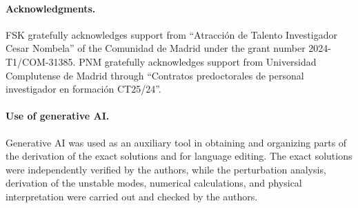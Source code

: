 \documentclass[aps,prl,reprint,superscriptaddress,nofootinbib,floatfix]{revtex4-2}
\begin{document}
\paragraph{Acknowledgments.}
FSK gratefully acknowledges support from ``Atracci\'on de Talento Investigador Cesar Nombela'' of the Comunidad de Madrid under the grant number 2024-T1/COM-31385.
PNM gratefully acknowledges support from Universidad Complutense de Madrid through ``Contratos predoctorales de personal investigador en formación CT25/24''.


\paragraph{Use of generative AI.}

Generative AI was used as an auxiliary tool in obtaining and organizing parts of the derivation of the exact solutions and for language editing. 
The exact solutions were independently verified by the authors, while the perturbation analysis, derivation of the unstable modes, numerical calculations, and physical interpretation were carried out and checked by the authors.
\end{document}
